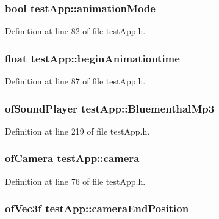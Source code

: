 \hypertarget{classtest_app_a2a5d49fd1f7f50f745f56095a1fa0099}{
\subsubsection[{animation\-Mode}]{\setlength{\rightskip}{0pt plus 5cm}bool test\-App\-::animation\-Mode}}\label{classtest_app_a2a5d49fd1f7f50f745f56095a1fa0099}


Definition at line 82 of file test\-App.\-h.

\hypertarget{classtest_app_adcaa52132409ab0ad077236f9e6fa180}{
\subsubsection[{begin\-Animationtime}]{\setlength{\rightskip}{0pt plus 5cm}float test\-App\-::begin\-Animationtime}}\label{classtest_app_adcaa52132409ab0ad077236f9e6fa180}


Definition at line 87 of file test\-App.\-h.

\hypertarget{classtest_app_af696fd13ee9ecb38ac0ba0b72543ce06}{
\subsubsection[{Bluementhal\-Mp3}]{\setlength{\rightskip}{0pt plus 5cm}of\-Sound\-Player test\-App\-::\-Bluementhal\-Mp3}}\label{classtest_app_af696fd13ee9ecb38ac0ba0b72543ce06}


Definition at line 219 of file test\-App.\-h.

\hypertarget{classtest_app_a0278ee237cbbd881252d6273b131bb55}{
\subsubsection[{camera}]{\setlength{\rightskip}{0pt plus 5cm}of\-Camera test\-App\-::camera}}\label{classtest_app_a0278ee237cbbd881252d6273b131bb55}


Definition at line 76 of file test\-App.\-h.

\hypertarget{classtest_app_ad3319d9cd3cb00e898f4f602b879efad}{
\subsubsection[{camera\-End\-Position}]{\setlength{\rightskip}{0pt plus 5cm}of\-Vec3f test\-App\-::camera\-End\-Position}}\label{classtest_app_ad3319d9cd3cb00e898f4f602b879efad}


